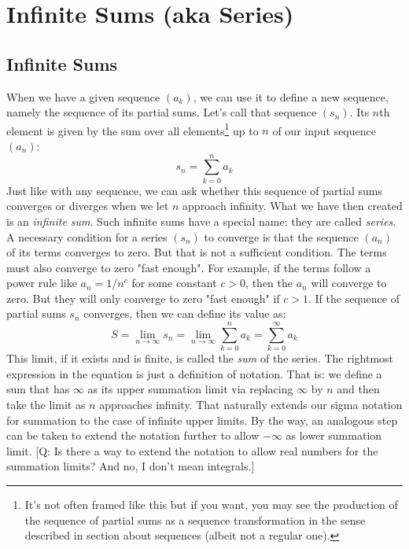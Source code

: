 \section{Infinite Sums (aka Series)}

\subsection{Infinite Sums}
When we have a given sequence $(a_k)$, we can use it to define a new sequence, namely the sequence of its partial sums. Let's call that sequence $(s_n)$. Its $n$th element is given by the sum over all elements\footnote{It's not often framed like this but if you want, you may see the production of the sequence of partial sums as a sequence transformation in the sense described in section about sequences (albeit not a regular one).} up to $n$ of our input sequence $(a_n)$:
\begin{equation}
 s_n = \sum_{k=0}^n a_k
\end{equation}
Just like with any sequence, we can ask whether this sequence of partial sums converges or diverges when we let $n$ approach infinity. What we have then created is an \emph{infinite sum}. Such infinite sums have a special name: they are called \emph{series}. A necessary condition for a series $(s_n)$ to converge is that the sequence $(a_n)$ of its terms converges to zero. But that is not a sufficient condition. The terms must also converge to zero "fast enough". For example, if the terms follow a power rule like $a_n = 1 / n^c$ for some constant $c > 0$, then the $a_n$ will converge to zero. But they will only converge to zero "fast enough" if $c > 1$. If the sequence of partial sums $s_n$ converges, then we can define its value as:
\begin{equation}
\label{Eq:InfiniteSum}
S = \lim_{n \rightarrow \infty} s_n 
  = \lim_{n \rightarrow \infty} \sum_{k=0}^n a_k
  = \sum_{k=0}^{\infty} a_k
\end{equation}
This limit, if it exists and is finite, is called the \emph{sum} of the series. The rightmost expression in the equation is just a definition of notation. That is: we define a sum that has $\infty$ as its upper summation limit via replacing $\infty$ by $n$ and then take the limit as $n$ approaches infinity. That naturally extends our sigma notation for summation to the case of infinite upper limits. By the way, an analogous step can be taken to extend the notation further to allow $-\infty$ as lower summation limit. [Q: Is there a way to extend the notation to allow real numbers for the summation limits? And no, I don't mean integrals.]

